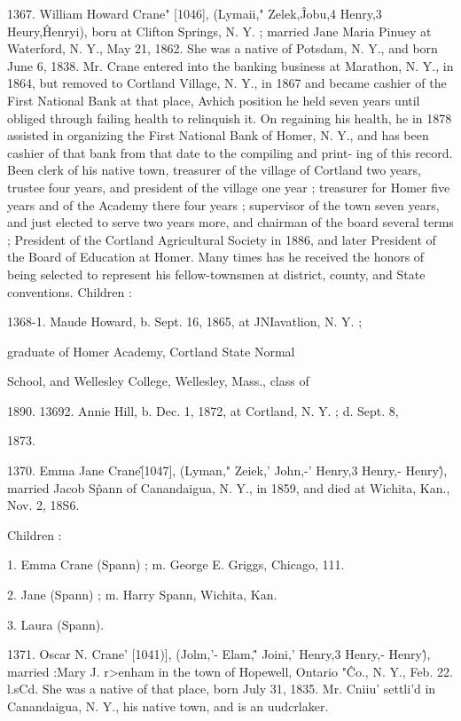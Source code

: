 \documentclass{book}
\begin{document}
1367. William Howard Crane" [1046], (Lymaii," Zelek,\^ 
Jobu,4 Henry,3 Heury,\^ Henryi), boru at Clifton Springs, N. Y. ; 
married Jane Maria Pinuey at Waterford, N. Y., May 21, 1862. 
She was a native of Potsdam, N. Y., and born June 6, 1838. 
Mr. Crane entered into the banking business at Marathon, N. Y., 
in 1864, but removed to Cortland Village, N. Y., in 1867 and 
became cashier of the First National Bank at that place, Avhich 
position he held seven years until obliged through failing health 
to relinquish it. On regaining his health, he in 1878 assisted in 
organizing the First National Bank of Homer, N. Y., and has 
been cashier of that bank from that date to the compiling and print- 
ing of this record. Been clerk of his native town, treasurer of 
the village of Cortland two years, trustee four years, and president 
of the village one year ; treasurer for Homer five years and of the 
Academy there four years ; supervisor of the town seven years, 
and just elected to serve two years more, and chairman of the 
board several terms ; President of the Cortland Agricultural 
Society in 1886, and later President of the Board of Education 
at Homer. Many times has he received the honors of being 
selected to represent his fellow-townsmen at district, county, and 
State conventions. Children : 

1368-1. Maude Howard, b. Sept. 16, 1865, at JNIavatlion, N. Y. ; 

graduate of Homer Academy, Cortland State Normal 

School, and Wellesley College, Wellesley, Mass., class of 

1890. 
13692. Annie Hill, b. Dec. 1, 1872, at Cortland, N. Y. ; d. Sept. 8, 

1873. 

1370. Emma Jane Crane\^ [1047], (Lyman," Zeiek,' John,-' 
Henry,3 Henry,- Henry\^), married Jacob S\^pann of Canandaigua, 
N. Y., in 1859, and died at Wichita, Kan., Nov. 2, 18S6. 

Children : 

1. Emma Crane (Spann) ; m. George E. Griggs, Chicago, 111. 

2. Jane (Spann) ; m. Harry Spann, Wichita, Kan. 

3. Laura (Spann). 

1371. Oscar N. Crane' [1041)], (Jolm,'- Elam,\^' Joini,' 
Henry,3 Henry,- Henry\^), married :Mary J. r>enham in the town 
of Hopewell, Ontario "\^ Co., N. Y., Feb. 22. l.sCd. She was a 
native of that place, born July 31, 1835. Mr. Cniiu' settli'd in 
Canandaigua, N. Y., his native town, and is an uudcrlaker. 
\end{document}
